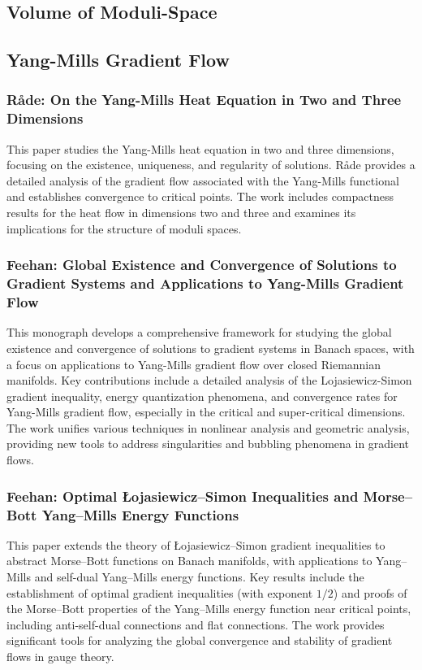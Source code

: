 \documentclass[10pt, letterpaper]{article}
\theoremstyle{custom}
\theoremstyle{definition}
\begin{document}
\vspace{1cm}


\subsection{Volume of Moduli-Space}






\subsection{Yang-Mills Gradient Flow}

\subsubsection{Råde: On the Yang-Mills Heat Equation in Two and Three Dimensions \cite{rade1992heat}} 
This paper studies the Yang-Mills heat equation in two and three dimensions, focusing on the existence, uniqueness, and regularity of solutions. Råde provides a detailed analysis of the gradient flow associated with the Yang-Mills functional and establishes convergence to critical points. The work includes compactness results for the heat flow in dimensions two and three and examines its implications for the structure of moduli spaces.

\subsubsection{Feehan: Global Existence and Convergence of Solutions to Gradient Systems and Applications to Yang-Mills Gradient Flow \cite{feehan2016gradient}} 
This monograph develops a comprehensive framework for studying the global existence and convergence of solutions to gradient systems in Banach spaces, with a focus on applications to Yang-Mills gradient flow over closed Riemannian manifolds. Key contributions include a detailed analysis of the Lojasiewicz-Simon gradient inequality, energy quantization phenomena, and convergence rates for Yang-Mills gradient flow, especially in the critical and super-critical dimensions. The work unifies various techniques in nonlinear analysis and geometric analysis, providing new tools to address singularities and bubbling phenomena in gradient flows.


\subsubsection{Feehan: Optimal \L{}ojasiewicz–Simon Inequalities and Morse–Bott Yang–Mills Energy Functions \cite{feehan2020lojasiewicz}} 
This paper extends the theory of \L{}ojasiewicz–Simon gradient inequalities to abstract Morse–Bott functions on Banach manifolds, with applications to Yang–Mills and self-dual Yang–Mills energy functions. Key results include the establishment of optimal gradient inequalities (with exponent \(1/2\)) and proofs of the Morse–Bott properties of the Yang–Mills energy function near critical points, including anti-self-dual connections and flat connections. The work provides significant tools for analyzing the global convergence and stability of gradient flows in gauge theory.
\end{document}
